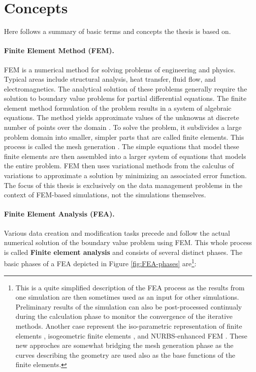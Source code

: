 
\section{Concepts}

Here follows a summary of basic terms and concepts the thesis is based on.

\paragraph{Finite Element Method (FEM).} FEM is a numerical method for solving problems of engineering and physics. Typical areas include structural analysis, heat transfer, fluid flow, and electromagnetics. The analytical solution of these problems generally require the solution to boundary value problems for partial differential equations. The finite element method formulation of the problem results in a system of algebraic equations. The method yields approximate values of the unknowns at discrete number of points over the domain \cite{Fish2007}. To solve the problem, it subdivides a large problem domain into smaller, simpler parts that are called finite elements. This process is called the mesh generation \cite{Frey2000,Rypl1998}. The simple equations that model these finite elements are then assembled into a larger system of equations that models the entire problem. FEM then uses variational methods from the calculus of variations to approximate a solution by minimizing an associated error function. The focus of this thesis is exclusively on the data management problems in the context of FEM-based simulations, not the simulations themselves.


\paragraph{Finite Element Analysis (FEA).} Various data creation and modification tasks precede and follow the actual numerical solution of the boundary value problem using FEM. This whole process is called \textbf{Finite element analysis} and consists of several distinct phases. The basic phases of a FEA depicted in Figure \ref{fig:FEA-phases} are\footnote{This is a quite simplified description of the FEA process as the results from one simulation are then sometimes used as an input for other simulations. Preliminary results of the simulation can also be post-processed continualy during the calculation phase to monitor the convergence of the iterative methods. Another case represent the iso-parametric representation of finite elements \cite{Bergheau2008}, isogeometric finite elements \cite{Hughes2005}, and NURBS-enhanced FEM \cite{Legrain2013}. These new approches are somewhat bridging the mesh generation phase as the curves describing the geometry are used also as the base functions of the finite elements.}:

